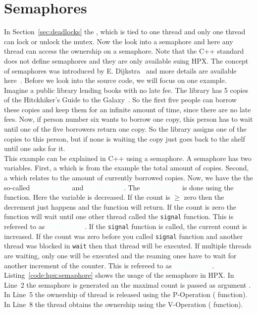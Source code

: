 \section{Semaphores}
\label{sec:hpx:semaphores}
In Section~\ref{sec:deadlocks} the , which is tied to one thread and only one thread can lock or unlock the mutex. Now the look into a semaphore and here any thread can access the ownership on a semaphore. Note that the C++ standard does not define semaphores and they are only available suing HPX. The concept of semaphores was introduced by E. Dijkstra~\cite{dijkstra1962over} and more details are available here~\cite{downey2008little}. Before we look into the source code, we will focus on one example. \\

Imagine a public library lending books with no late fee. The library has 5 copies of the Hitckhiker's Guide to the Galaxy~\cite{adams2017ultimate}. So the first five people can borrow these copies and keep them for an infinite amount of time, since there are no late fees. Now, if person number six wants to borrow one copy, this person has to wait until one of the five borrowers return one copy. So the library assigns one of the copies to this person, but if none is waiting the copy just goes back to the shelf until one asks for it. \\

This example can be explained in C++ using a semaphore. A semaphore has two variables. First, a  which is from the example the total amount of copies. Second, a  which relates to the amount of currently borrowed copies. Now, we have the the so-called \textcolor{azure}{P-Operation} and \textcolor{azure}{V-Operation}. The \textcolor{azure}{P-Operation} is done using the  function. Here the variable  is decreased. If the count is $\geq$ zero then the decrement just happens and the function will return. If the count is zero the function will wait until one other thread called the \lstinline|signal| function. This is refereed to as \textcolor{azure}{P-Operation}. If the \lstinline|signal| function is called, the current count is increased. If the count was zero before you called \lstinline|signal| function and another thread was blocked in \lstinline|wait| then that thread will be executed. If multiple threads are waiting, only one will be executed and the reaming ones have to wait for another increment of the counter. This is refereed to as \textcolor{azure}{V-Operation}. Listing~\ref{code:hpx:semaphore} shows the usage of the semaphore in HPX. In Line~2 the semaphore is generated an the maximal count is passed as argument . In Line~5 the ownership of thread  is released using the P-Operation ( function). In Line~8 the thread  obtains the ownership using the V-Operation ( function).


